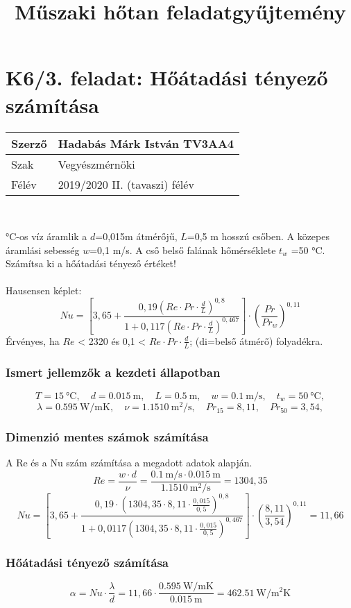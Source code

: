 \documentclass[11pt, a4paper]{report}
\author{}
\title{Műszaki hőtan feladatgyűjtemény}
\begin{document}
\section*{K6/3. feladat: Hőátadási tényező számítása}
	\begin{tabular}{ | p{2cm} | p{14cm} | } 
		\hline
		Szerző & Hadabás Márk István TV3AA4 \\ 
		\hline
		Szak & Vegyészmérnöki \\ 
		\hline
		Félév & 2019/2020 II. (tavaszi) félév \\ 
		\hline
	\end{tabular} \\
	\vspace{0.5cm} 
		
	 °C-os víz áramlik a $d$=0,015m átmérőjű, $L$=0,5 m hosszú csőben. A közepes áramlási sebesség $w$=0,1 m/s. A cső belső falának hőmérséklete $t_w$ =50 °C. Számítsa ki a hőátadási tényező értéket!
	\\ \\
	Hausensen képlet:
		\[ Nu = \left[ 3,65 + \frac{0,19 \left( Re \cdot Pr \cdot \frac{d}{L} \right)^{0,8} }{1 + 0,117 \left( Re \cdot Pr \cdot \frac{d}{L} \right)^{0,467} } \right] \cdot \left( \frac{Pr}{Pr_w} \right)^{0,11}  \]
	Érvényes, ha $Re$ < 2320 és 0,1 < $Re \cdot Pr \cdot \frac{d}{L}$; (di=belső átmérő) folyadékra.
	\\ 
	\subsubsection{Ismert jellemzők a kezdeti állapotban}
		\begin{equation*}	
			T= \SI{15}{\celsius}, 
			\quad
			d= \SI{0,015}{\meter},
			\quad
			L= \SI{0,5}{\meter},
			\quad
			w= \SI{0,1}{\meter\per\second},
			\quad
			t_w= \SI{50}{\celsius},			
		\end{equation*}
		\begin{equation*}
			\lambda= \SI{0,595}{\watt\per\meter\kelvin},
			\quad
			\nu = \SI{1,15 10}{\meter\squared\per\second },
			\quad
			Pr_{15}= 8,11,
			\quad
			Pr_{50}= 3,54,			
		\end{equation*}
		\noindent\hrulefill
	\subsubsection{Dimenzió mentes számok számítása}
	A Re és a Nu szám számítása a megadott adatok alapján. 
		\begin{equation}
			Re = \frac{w \cdot d}{\nu} = \frac{\SI{0,1}{\meter\per\second} \cdot \SI{0,015}{\meter}}{\SI{1,15 10}{\meter\squared\per\second }}=1304,35
		\end{equation}
		\begin{equation}
			Nu = \left[ 3,65 + \frac{ 0,19 \cdot \left( 1304,35 \cdot 8,11 \cdot\frac{0,015}{0,5}\right)^{0,8}}{1 + 0,0117 \left( 1304,35 \cdot 8,11 \cdot \frac{0,015}{0,5}\right)^{0,467}}\right] \cdot \left( \frac{8,11}{3,54}\right)^{0,11}  = 11,66
		\end{equation}
	\subsubsection{Hőátadási tényező számítása}
		\begin{equation}
			\alpha = Nu \cdot \frac{\lambda}{d} = 11,66 \cdot \frac{\SI{0,595}{\watt\per\meter\kelvin}}{\SI{0,015}{\meter}}= \SI{462,51}{\watt\per\meter\squared\kelvin} 
		\end{equation}		
\end{document}
